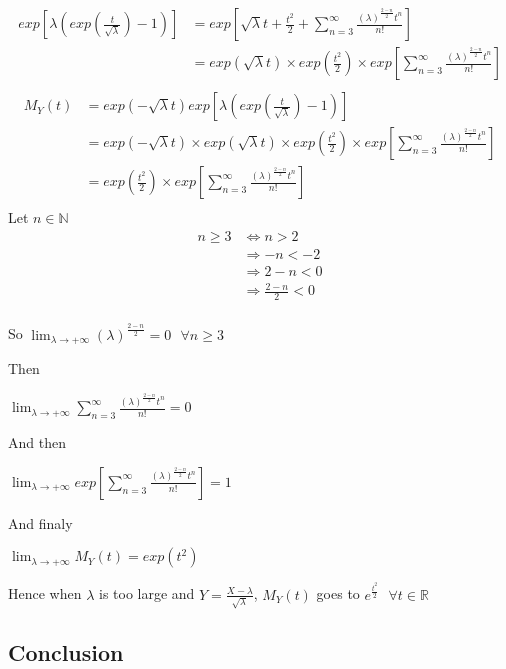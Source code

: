 \documentclass[11pt]{article}
\def\gt{>}
\def\lt{<}
\begin{document}
\begin{align*}
exp[\lambda(exp(\frac{t}{\sqrt{\lambda}})-1)]&=exp[\sqrt{\lambda}t +\frac{t^2}{2}+ \sum_{n=3}^{\infty} \frac{{({\lambda} )}^{\frac{2-n}{2}} t^n}{  n!}]\\
&=exp(\sqrt{\lambda}t) \times exp(\frac{t^2}{2}) \times exp[ \sum_{n=3}^{\infty} \frac{{({\lambda} )}^{\frac{2-n}{2}} t^n}{  n!}]\\
\end{align*}
\begin{align*}
M_Y(t)&=exp(-\sqrt{\lambda}t)  exp[\lambda(exp(\frac{t}{\sqrt{\lambda}})-1)]\\  
&=exp(-\sqrt{\lambda}t) \times   exp(\sqrt{\lambda}t) \times exp(\frac{t^2}{2}) \times exp[ \sum_{n=3}^{\infty} \frac{{({\lambda} )}^{\frac{2-n}{2}} t^n}{  n!}]\\  
&=exp(\frac{t^2}{2}) \times exp[ \sum_{n=3}^{\infty} \frac{{({\lambda} )}^{\frac{2-n}{2}} t^n}{  n!}]\\ 
\end{align*}
Let $ n \in \mathbb{N}$
\begin{align*}
n \ge 3 &\iff n \gt 2  \\  
&\Rightarrow -n \lt -2  \\
&\Rightarrow 2-n \lt 0  \\
&\Rightarrow \frac{2-n}{2}  \lt 0 \\
\end{align*}

So $\lim_{{\lambda \to +\infty}} (\lambda)^{ \frac{2-n}{2}}=0\textbf{ } \forall n \ge 3 $

Then 

$\lim_{{\lambda \to +\infty}} \sum_{n=3}^{\infty} \frac{{({\lambda} )}^{\frac{2-n}{2}} t^n}{  n!}=0 $

And then

$\lim_{{\lambda \to +\infty}} exp[\sum_{n=3}^{\infty} \frac{{({\lambda} )}^{\frac{2-n}{2}} t^n}{  n!}]=1 $

And finaly

$\lim_{{\lambda \to +\infty}} M_Y(t)=exp(t^2)$

  
  Hence when $\lambda$ is too large and  $Y=\frac{X-\lambda}{\sqrt{\lambda}}$, $M_Y(t)$ goes to $e^{ \frac{t^2}{2} }  \text{ }\forall t \in \mathbb{R}$ 
  
  
 \subsection{Conclusion} 
 
\end{document}
